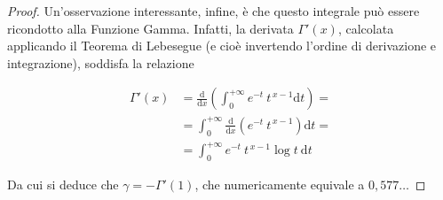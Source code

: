 \begin{proof}
	Un'osservazione interessante, infine, è che questo integrale può essere ricondotto alla Funzione Gamma.	Infatti, la derivata $\Gamma'(x)$, calcolata applicando il Teorema di Lebesegue (e cioè invertendo l'ordine di derivazione e integrazione), soddisfa la relazione

	\begin{equation*}
		\begin{split}
			\Gamma'(x)&=\frac{\mathrm{d}}{\mathrm{d}x}\left( \int^{+\infty}_0e^{-t}\: t^{\,x-1}\mathrm{d}t\right) =\\&=\int^{+\infty}_0\frac{\mathrm{d}}{\mathrm{d}x}\left( e^{-t}\: t^{\,x-1}\right) \mathrm{d}t=\\&=\int^{+\infty}_0e^{-t}\: t^{\,x-1}\log t\:\mathrm{d}t
		\end{split}
	\end{equation*}

	Da cui si deduce che $\gamma=-\Gamma'(1)$, che numericamente equivale a $0,577\dots$
\end{proof}
\pagebreak